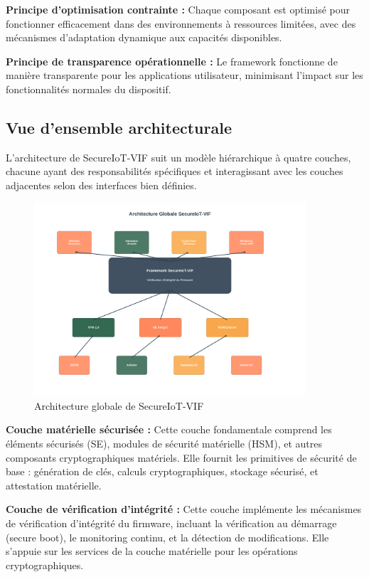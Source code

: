 \textbf{Principe d'optimisation contrainte :} Chaque composant est optimisé pour fonctionner efficacement dans des environnements à ressources limitées, avec des mécanismes d'adaptation dynamique aux capacités disponibles.

\textbf{Principe de transparence opérationnelle :} Le framework fonctionne de manière transparente pour les applications utilisateur, minimisant l'impact sur les fonctionnalités normales du dispositif.

\subsection{Vue d'ensemble architecturale}

L'architecture de SecureIoT-VIF suit un modèle hiérarchique à quatre couches, chacune ayant des responsabilités spécifiques et interagissant avec les couches adjacentes selon des interfaces bien définies.

\begin{figure}[h]
    \centering
    \includegraphics[width=0.9\textwidth]{assets/figures/secureiot_architecture.png}
    \caption{Architecture globale de SecureIoT-VIF}
    \label{fig:secureiot-architecture}
\end{figure}

\textbf{Couche matérielle sécurisée :} Cette couche fondamentale comprend les éléments sécurisés (\ac{SE}), modules de sécurité matérielle (\ac{HSM}), et autres composants cryptographiques matériels. Elle fournit les primitives de sécurité de base : génération de clés, calculs cryptographiques, stockage sécurisé, et attestation matérielle.

\textbf{Couche de vérification d'intégrité :} Cette couche implémente les mécanismes de vérification d'intégrité du firmware, incluant la vérification au démarrage (secure boot), le monitoring continu, et la détection de modifications. Elle s'appuie sur les services de la couche matérielle pour les opérations cryptographiques.

